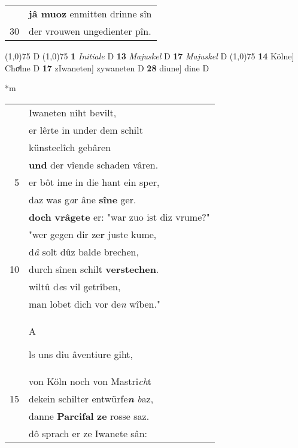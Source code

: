 \documentclass[8pt,a4paper,notitlepage]{article}
\begin{document}
\begin{table}[ht]
\begin{minipage}[t]{0.5\linewidth}
\begin{tabular}{rl}
 & \textbf{jâ muoz} enmitten drinne sîn\\ 
30 & der vrouwen ungedienter pîn.\\ 
\end{tabular}
\scriptsize
\line(1,0){75} \newline
D \newline
\line(1,0){75} \newline
\textbf{1} \textit{Initiale} D  \textbf{13} \textit{Majuskel} D  \textbf{17} \textit{Majuskel} D  \newline
\line(1,0){75} \newline
\textbf{14} Kölne] Choͤlne D \textbf{17} zIwaneten] zywaneten D \textbf{28} diune] dine D \newline
\end{minipage}
\hspace{0.5cm}
\begin{minipage}[t]{0.5\linewidth}
\small
\begin{center}*m
\end{center}
\begin{tabular}{rl}
 & Iwaneten niht bevilt,\\ 
 & er lêrte in under dem schilt\\ 
 & künsteclîch gebâren\\ 
 & \textbf{und} der vîende schaden vâren.\\ 
5 & er bôt ime in die hant ein sper,\\ 
 & daz was g\textit{a}r âne \textbf{sîne} ger.\\ 
 & \textbf{doch} \textbf{vrâgete} er: "war zuo ist diz vrume?"\\ 
 & "wer gegen dir ze\textbf{r} juste kume,\\ 
 & d\textit{â} solt dûz balde brechen,\\ 
10 & durch sînen schilt \textbf{verstechen}.\\ 
 & wiltû d\textit{e}s vil getrîben,\\ 
 & man lobet dich vor de\textit{n} wîben."\\ 
 & \begin{large}A\end{large}ls uns diu âventiure giht,\\ 
 & von Köln noch von Mastri\textit{ch}t\\ 
15 & dekein schilter entwürfe\textit{\textbf{n}} \textit{b}az,\\ 
 & danne \textbf{Parcifal} \textbf{ze} rosse saz.\\ 
 & dô sprach er ze Iwanete sân:\\ 

\end{tabular}
\end{minipage}
\end{table}
\end{document}
